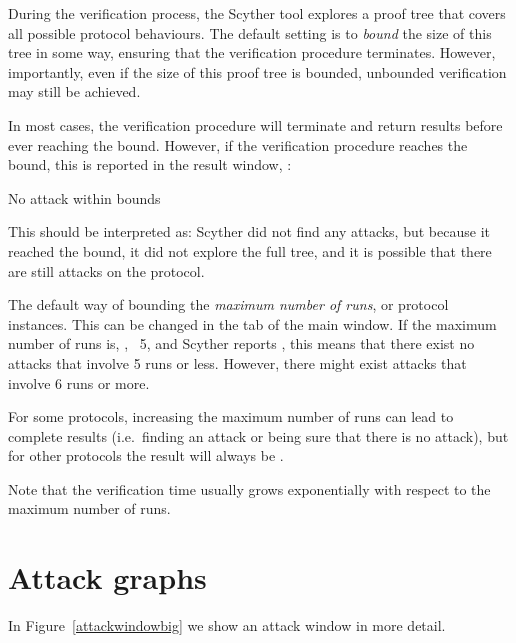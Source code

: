 \documentclass{book}
\begin{document}
During the verification process, the Scyther tool explores a proof tree
that covers all
possible protocol behaviours.  The default setting is to {\em bound} the
size of this tree in some
way, ensuring that the verification procedure terminates. However,
importantly, even if the size of this proof tree is bounded, unbounded
verification may still be achieved.

In most cases, the verification procedure will terminate and return
results before ever reaching the bound. However, if the verification procedure
reaches the bound, this is reported in the result window, \eg:

\begin{screen}
No attack within bounds
\end{screen}

This should be interpreted as: Scyther did not find any attacks, but
because it reached the bound, it did not explore the full tree, and it
is possible that there are still attacks on the protocol.

The default way of bounding the {\em maximum number of runs}, or protocol
instances. This can be changed in the  tab of the main
window. If the maximum number of runs is, \eg, ~5, and Scyther reports
, this means that there exist no attacks
that involve 5 runs or less. However, there might exist attacks that
involve 6 runs or more.

For some protocols, increasing the maximum number of runs can lead to
complete results (i.e.~finding an attack or being sure that there is no
attack), but for other protocols the result will always be .

Note that the verification time usually grows exponentially with respect
to the maximum number of runs.

\section{Attack graphs}
\label{sec:graphical}

In Figure~\ref{attackwindowbig} we show an attack window in more detail.
\end{document}
